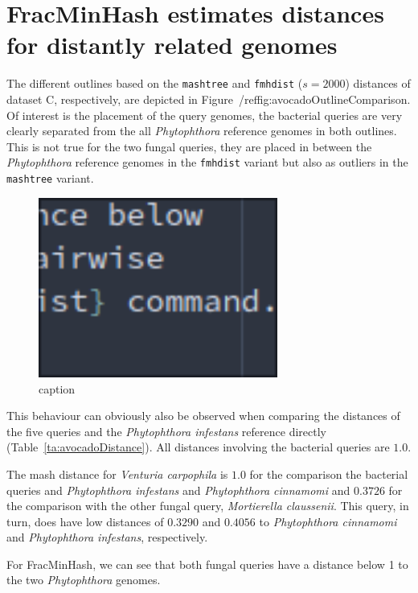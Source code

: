 \section{FracMinHash estimates distances for distantly related genomes}
The different outlines based on the \texttt{mashtree} and \texttt{fmhdist}
($s=2000$) distances of dataset C, respectively, are depicted in
Figure~/ref{fig:avocadoOutlineComparison}. Of interest is the placement of the
query genomes, the bacterial queries are very clearly separated from the all
\textit{Phytophthora} reference genomes in both outlines. This is not true for
the two fungal queries, they are placed in between the \textit{Phytophthora}
reference genomes in the \texttt{fmhdist} variant but also as outliers in the
\texttt{mashtree} variant.

\begin{figure}
  \centering
  \includegraphics[width=0.7\textwidth]{figures/image.png}
  \caption{caption}
  \label{fig:avocadoOutlineComparison}
\end{figure}

This behaviour can obviously also be observed when comparing the distances of
the five queries and the \textit{Phytophthora infestans} reference directly
(Table~\ref{ta:avocadoDistance}). All distances involving the bacterial queries
are $1.0$.

The mash distance for \textit{Venturia carpophila} is $1.0$ for the comparison
the bacterial queries and \textit{Phytophthora infestans} and
\textit{Phytophthora cinnamomi} and $0.3726$ for the comparison with the other
fungal query, \textit{Mortierella claussenii}. This query, in turn, does have
low distances of $0.3290$ and $0.4056$ to \textit{Phytophthora cinnamomi} and
\textit{Phytophthora infestans}, respectively.

For FracMinHash, we can see that both fungal queries have a distance below 1 to
the two \textit{Phytophthora} genomes.


